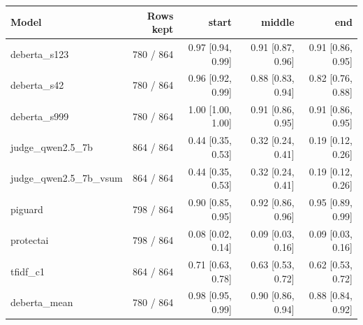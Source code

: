 \begin{tabular}{lrrrr}
\toprule
\textbf{Model} & \textbf{Rows kept} & \textbf{start} & \textbf{middle} & \textbf{end} \\
\midrule
deberta\_s123 & 780 / 864 & 0.97 {\scriptsize[0.94, 0.99]} & 0.91 {\scriptsize[0.87, 0.96]} & 0.91 {\scriptsize[0.86, 0.95]} \\
deberta\_s42 & 780 / 864 & 0.96 {\scriptsize[0.92, 0.99]} & 0.88 {\scriptsize[0.83, 0.94]} & 0.82 {\scriptsize[0.76, 0.88]} \\
deberta\_s999 & 780 / 864 & 1.00 {\scriptsize[1.00, 1.00]} & 0.91 {\scriptsize[0.86, 0.95]} & 0.91 {\scriptsize[0.86, 0.95]} \\
judge\_qwen2.5\_7b & 864 / 864 & 0.44 {\scriptsize[0.35, 0.53]} & 0.32 {\scriptsize[0.24, 0.41]} & 0.19 {\scriptsize[0.12, 0.26]} \\
judge\_qwen2.5\_7b\_vsum & 864 / 864 & 0.44 {\scriptsize[0.35, 0.53]} & 0.32 {\scriptsize[0.24, 0.41]} & 0.19 {\scriptsize[0.12, 0.26]} \\
piguard & 798 / 864 & 0.90 {\scriptsize[0.85, 0.95]} & 0.92 {\scriptsize[0.86, 0.96]} & 0.95 {\scriptsize[0.89, 0.99]} \\
protectai & 798 / 864 & 0.08 {\scriptsize[0.02, 0.14]} & 0.09 {\scriptsize[0.03, 0.16]} & 0.09 {\scriptsize[0.03, 0.16]} \\
tfidf\_c1 & 864 / 864 & 0.71 {\scriptsize[0.63, 0.78]} & 0.63 {\scriptsize[0.53, 0.72]} & 0.62 {\scriptsize[0.53, 0.72]} \\
deberta\_mean & 780 / 864 & 0.98 {\scriptsize[0.95, 0.99]} & 0.90 {\scriptsize[0.86, 0.94]} & 0.88 {\scriptsize[0.84, 0.92]} \\
\bottomrule
\end{tabular}
